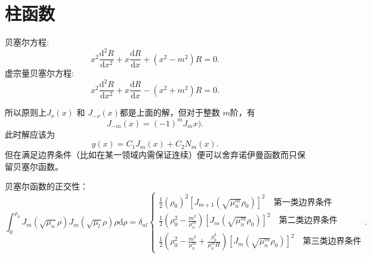 \documentclass[12pt,a4paper,openany,twoside]{book}
\numberwithin{equation}{section}
\begin{document}
      \section{柱函数}
          贝塞尔方程:
          \begin{equation}
            x^2 \frac{\mathrm{d} ^2 R}{\mathrm{d} x^2 } + x \frac{\mathrm{d} R }{\mathrm{d} x}  + (x^2 - m^2) R =0
          .
          \end{equation} 
          虚宗量贝塞尔方程:
          \begin{equation}
            x^2 \frac{\mathrm{d} ^2 R}{\mathrm{d} x^2} + x \frac{\mathrm{d} R}{\mathrm{d} x}  - (x^2 + m^2) R = 0
          .
          \end{equation} 

          所以原则上$J_\nu (x)$ 和 $J_{-\nu} (x)$都是上面的解，但对于整数 $m$阶，有
           \begin{equation}
             J_{-m} (x) = (-1)^m J_mx)
          .
          \end{equation} 
          此时解应该为
           \begin{equation}
             y(x) = C_1 J_m(x) + C_2 N_m(x)
          .
          \end{equation} 
          但在满足边界条件（比如在某一领域内需保证连续）便可以舍弃诺伊曼函数而只保留贝塞尔函数。


          贝塞尔函数的正交性：
          \begin{equation}
            \int _0^ {\rho_0} J_m(\sqrt{\mu_n} \rho) J_m (\sqrt{\mu_l} \rho) \rho \mathrm{d} \rho = 
            \delta_{nl}\begin{cases}
              \frac{1}{2}(\rho_0)^2 [J_{m+1}(\sqrt{\mu_n^{m}} \rho_0)]^2 \quad \text{第一类边界条件} \\
                \frac{1}{2}\left( \rho_0^2 -\frac{m^2}{\mu_n^{m}} \right) [J_m (\sqrt{\mu_n^{m}} \rho_0)]^2 \quad \text{第二类边界条件}\\
                \frac{1}{2}\left(\rho_0^2 - \frac{m^2}{\mu_n^{m}} + \frac{\rho^2 _0}{\mu_n^m H}\right) [J_m (\sqrt{\mu_n^m} \rho_0)]^2 \quad \text{第三类边界条件}
                \end{cases}
          .
          \end{equation} 
\end{document}
